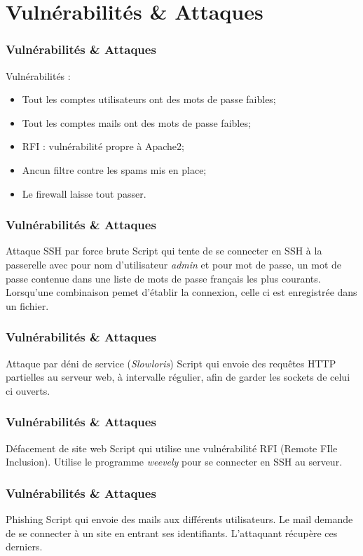 \documentclass{beamer}
\begin{document}
	\section{Vulnérabilités \& Attaques}
		\begin{frame}
			\frametitle{Vulnérabilités \& Attaques}
			Vulnérabilités :
			\begin{itemize}
				\item Tout les comptes utilisateurs ont des mots de passe faibles;
				\item Tout les comptes mails ont des mots de passe faibles;
				\item RFI : vulnérabilité propre à Apache2;
				\item Ancun filtre contre les spams mis en place;
				\item Le firewall laisse tout passer.
			\end{itemize}
		\end{frame}
		\begin{frame}
			\frametitle{Vulnérabilités \& Attaques}
			\begin{block}{Attaque SSH par force brute}
				Script qui tente de se connecter en SSH à la passerelle avec pour nom d'utilisateur \textit{admin} et pour mot de passe, un mot de passe contenue dans une liste de mots de passe français les plus courants.
				Lorsqu'une combinaison pemet d'établir la connexion, celle ci est enregistrée dans un fichier.
			\end{block}
		\end{frame}
		\begin{frame}
			\frametitle{Vulnérabilités \& Attaques}
			\begin{block}{Attaque par déni de service (\textit{Slowloris})}
				Script qui envoie des requêtes HTTP partielles au serveur web, à intervalle régulier, afin de garder les sockets de celui ci ouverts.
			\end{block}
		\end{frame}
		\begin{frame}
			\frametitle{Vulnérabilités \& Attaques}
			\begin{block}{Défacement de site web}
				Script qui utilise une vulnérabilité RFI (Remote FIle Inclusion). Utilise le programme \textit{weevely} pour se connecter en SSH au serveur.
			\end{block}
		\end{frame}
		\begin{frame}
			\frametitle{Vulnérabilités \& Attaques}
			\begin{block}{Phishing}
				Script qui envoie des mails aux différents utilisateurs. Le mail demande de se connecter à un site en entrant ses identifiants. L'attaquant récupère ces derniers.
			\end{block}
		\end{frame}
\end{document}
